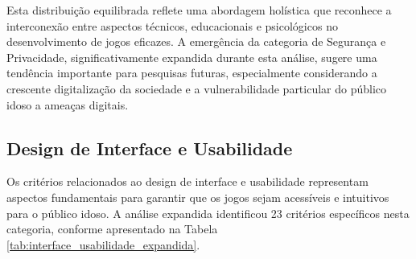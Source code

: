 Esta distribuição equilibrada reflete uma abordagem holística que reconhece a interconexão entre aspectos técnicos, educacionais e psicológicos no desenvolvimento de jogos eficazes. A emergência da categoria de Segurança e Privacidade, significativamente expandida durante esta análise, sugere uma tendência importante para pesquisas futuras, especialmente considerando a crescente digitalização da sociedade e a vulnerabilidade particular do público idoso a ameaças digitais.

\subsection{Design de Interface e Usabilidade}
\label{subsec:interface_usabilidade_expandida}

Os critérios relacionados ao design de interface e usabilidade representam aspectos fundamentais para garantir que os jogos sejam acessíveis e intuitivos para o público idoso. A análise expandida identificou 23 critérios específicos nesta categoria, conforme apresentado na Tabela \ref{tab:interface_usabilidade_expandida}.

